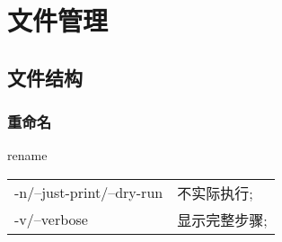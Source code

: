 \documentclass[hidelinks]{ctexart}
\begin{document}

\section{文件管理} %
\label{sec:文件管理}

\subsection{文件结构} %
\label{sub:文件结构}

\subsubsection{重命名} %
\label{ssub:重命名}

\begin{shcommand}{rename}
\ttfamily
\begin{tabular}{@{$\bullet\quad$}ll}
   -n/--just-print/--dry-run      & 不实际执行; \\
   -v/--verbose & 显示完整步骤; \\
\end{tabular} 
\end{shcommand}





\end{document}
